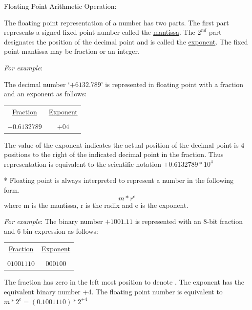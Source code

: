 \documentclass[11pt, a4paper, oneside]{book}
\begin{document}
                Floating Point Arithmetic Operation:

                The floating point representation of a number has two parts. The first part represents a signed fixed point number called the \underline{mantissa}. The $2^{nd}$ part designates the position of the decimal point and is called the \underline{exponent}. The fixed point mantissa may be fraction or an
                integer.

                \textit{For example}:

                The decimal number `$+6132.789$' is represented in floating point with a fraction and an exponent as follows:\\

                \begin{tabular}{c c}
                  \underline{Fraction} & \underline{Exponent}\\
                   & \\
                  $+0.6132789$ & $+04$\\
                \end{tabular}

                The value of the exponent indicates the actual position of the decimal point is 4 positions to the right of the indicated decimal point in the fraction. Thus representation is equivalent to the scientific notation $+0.6132789 * 10^4$

                * Floating point is always interpreted to represent a number in the following form.
                $$
                m * r^e
                $$
                where m is the mantissa, r is the radix and e is the exponent.

                \textit{For example}: The binary number $+1001.11$ is represented with an 8-bit fraction and 6-bin expression as follows:\\

                \begin{tabular}{c c}
                  \underline{Fraction} & \underline{Exponent}\\
                   & \\
                  $01001110$ & $000100$\\
                \end{tabular}

                The fraction has zero in the left most position to denote . The exponent has the equivalent binary number +4. The floating point number is equivalent to $m*2^e=(0.1001110)*2^{+4}$
\end{document}
